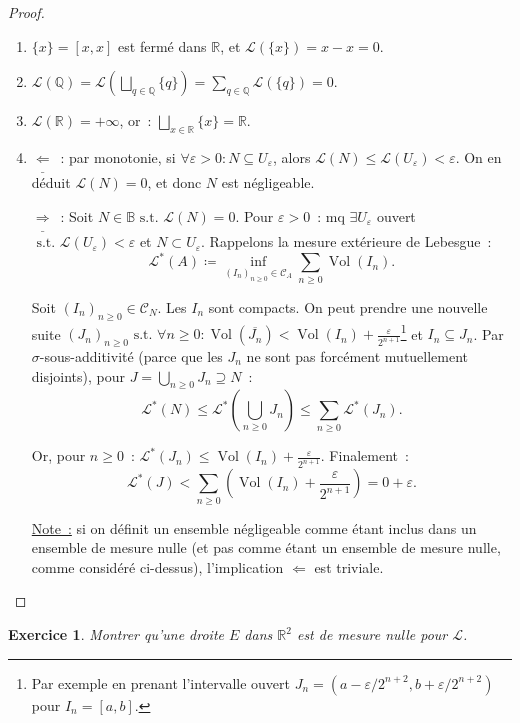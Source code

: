 \documentclass{article}
\newtheorem{ex}{Exercice}[section]
\newcommand{\pinfty}{{+\infty}}
\newcommand{\st}{\text{ s.t. }}
\newcommand{\Q}{{\mathbb Q}}
\newcommand{\R}{{\mathbb R}}
\newcommand{\B}{{\mathbb B}}
\DeclareMathOperator{\Vol}{Vol}
\begin{document}
\begin{proof}~
\begin{enumerate}
	\item $\{x\} = [x, x]$ est fermé dans $\R$, et $\mathcal L(\{x\}) = x-x = 0$.
	\item $\mathcal L(\Q) = \mathcal L(\bigsqcup_{q \in \Q}\{q\}) = \sum_{q \in \Q}\mathcal L(\{q\}) = 0$.
	\item $\mathcal L(\R) = \pinfty$, or~: $\bigsqcup_{x \in \R}\{x\} = \R$.
	\item $\underline {\Leftarrow}$~: par monotonie, si $\forall \varepsilon > 0 : N \subseteq U_\varepsilon$, alors $\mathcal L(N) \leq \mathcal L(U_\varepsilon) < \varepsilon$.
	On en déduit $\mathcal L(N) = 0$, et donc $N$ est négligeable.

	$\underline {\Rightarrow}$~: Soit $N \in \B \st \mathcal L(N) = 0$. Pour $\varepsilon > 0$~: mq $\exists U_\varepsilon$ ouvert $\st \mathcal L(U_\varepsilon) < \varepsilon$
	et $N \subset U_\varepsilon$. Rappelons la mesure extérieure de Lebesgue~:
	\[\mathcal L^*(A) \coloneqq \inf_{(I_n)_{n \geq 0} \in \mathcal C_A}\sum_{n \geq 0}\Vol(I_n).\]

	Soit $(I_n)_{n \geq 0} \in \mathcal C_N$. Les $I_n$ sont compacts. On peut prendre une nouvelle suite $(J_n)_{n \geq 0} \st \forall n \geq 0 :
	\Vol(\overline {J_n}) < \Vol(I_n) + \frac \varepsilon{2^{n+1}}$\footnote{Par exemple en prenant l'intervalle ouvert $J_n = (a-\varepsilon/2^{n+2}, b+\varepsilon/2^{n+2})$
	pour $I_n = [a, b]$.} et $I_n \subseteq J_n$. Par $\sigma$-sous-additivité (parce que les $J_n$ ne sont pas forcément mutuellement disjoints),
	pour $J = \bigcup_{n \geq 0}J_n \supseteq N$~:
	\[\mathcal L^*(N) \leq \mathcal L^*(\bigcup_{n \geq 0}J_n) \leq \sum_{n \geq 0}\mathcal L^*(J_n).\]

	Or, pour $n \geq 0$~: $\mathcal L^*(J_n) \leq \Vol(I_n) + \frac \varepsilon{2^{n+1}}$. Finalement~:
	\[\mathcal L^*(J) < \sum_{n \geq 0}\left(\Vol(I_n) + \frac \varepsilon{2^{n+1}}\right) = 0 + \varepsilon.\]

	\underline {Note~:} si on définit un ensemble négligeable comme étant inclus dans un ensemble de mesure nulle (et pas comme étant un ensemble de mesure nulle, comme considéré
	ci-dessus), l'implication $\Leftarrow$ est triviale.
\end{enumerate}
\end{proof}

\begin{ex} Montrer qu'une droite $E$ dans $\R^2$ est de mesure nulle pour $\mathcal L$.
\end{ex}
\end{document}
